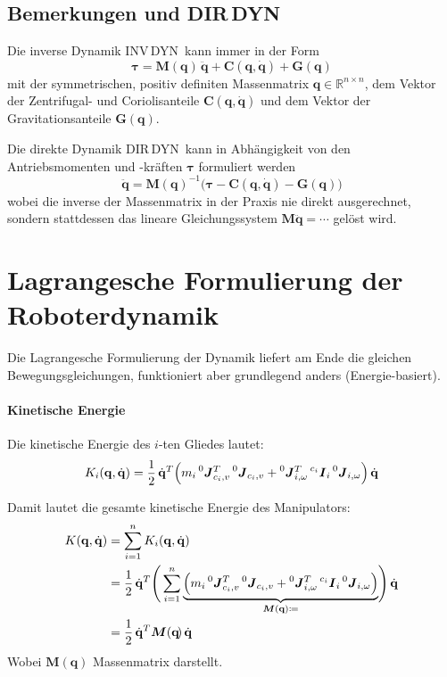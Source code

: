 \documentclass[a4paper, 11pt, accentcolor = tud3b]{tudreport}
\newcommand{\R}{\mathbb{R}}
\newcommand{\inreferenceto}[2]{\prescript{#1}{}{#2}}
\newcommand{\mat}[1]{\boldsymbol{#1}}
\renewcommand{\vec}[1]{\boldsymbol{\mathbf{#1}}}
\newcommand{\DIRDYN}{DIR\,DYN~}
\newcommand{\INVDYN}{INV\,DYN~}
\begin{document}
			\subsection{Bemerkungen und DIR\,DYN}
				Die inverse Dynamik \INVDYN kann immer in der Form
				\begin{equation*}
					\vec{\tau} = \mat{M}(\vec{q}\!)\, \ddot{\vec{q}} + \vec{C}(\vec{q}, \dot{\vec{q}}\!) + \vec{G}(\vec{q}\!)
				\end{equation*}
				mit der symmetrischen, positiv definiten Massenmatrix \( \mat{\vec{q}\!} \in \R^{n \times n} \), dem Vektor der Zentrifugal- und Coriolisanteile \( \vec{C}(\vec{q}, \dot{\vec{q}}\!) \) und dem Vektor der Gravitationsanteile \( \vec{G}(\vec{q}\!) \).
				
				Die direkte Dynamik \DIRDYN kann in Abhängigkeit von den Antriebsmomenten und -kräften \(\vec{\tau}\) formuliert werden
				\begin{equation*}
					\ddot{\vec{q}} = \mat{M}(\vec{q}\!)^{-1} \big( \vec{\tau} - \vec{C}(\vec{q}, \dot{\vec{q}}\!) - \vec{G}(\vec{q}\!) \big)
				\end{equation*}
				wobei die inverse der Massenmatrix in der Praxis nie direkt ausgerechnet, sondern stattdessen das lineare Gleichungssystem \( \mat{M} \ddot{\vec{q}} = \cdots \) gelöst wird.

		\section{Lagrangesche Formulierung der Roboterdynamik}
			Die Lagrangesche Formulierung der Dynamik liefert am Ende die gleichen Bewegungsgleichungen, funktioniert aber grundlegend anders (Energie-basiert).
			
			\paragraph{Kinetische Energie}
				Die kinetische Energie des \(i\)-ten Gliedes lautet:
				\begin{equation*}
					K_i(\vec{q}, \dot{\vec{q}}) = \frac{1}{2}\, \dot{\vec{q}}^T \Big( m_i \inreferenceto{0}{\mat{J}}_{c_i, v}^T \inreferenceto{0}{\mat{J}}_{c_i, v} + \inreferenceto{0}{\mat{J}}_{i, \omega}^T \inreferenceto{c_i}{\mat{I}}_i \inreferenceto{0}{\mat{J}}_{i, \omega} \Big)\, \dot{\vec{q}}
				\end{equation*}
				
				Damit lautet die gesamte kinetische Energie des Manipulators:
				\begin{align*}
					K(\vec{q}, \dot{\vec{q}}) &= \sum_{i = 1}^{n} K_i(\vec{q}, \dot{\vec{q}}) \\
						&= \frac{1}{2} \, \dot{\vec{q}}^T \Bigg( \sum_{i = 1}^{n} \underbrace{\Big( m_i \inreferenceto{0}{\mat{J}}_{c_i, v}^T \inreferenceto{0}{\mat{J}}_{c_i, v} + \inreferenceto{0}{\mat{J}}_{i, \omega}^T \inreferenceto{c_i}{\mat{I}}_i \inreferenceto{0}{\mat{J}}_{i, \omega} \Big)}_{\mat{M}(\vec{q}) \coloneqq} \! \Bigg)\, \dot{\vec{q}} \\
						&= \frac{1}{2} \, \dot{\vec{q}}^T \mat{M}(\vec{q}\!)\, \dot{\vec{q}}
				\end{align*}
				Wobei \( \mat{M}(\vec{q}) \) Massenmatrix darstellt.
			
\end{document}
